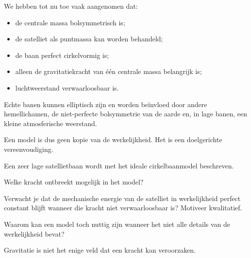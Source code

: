 \documentclass{ximera}
\begin{document}

We hebben tot nu toe vaak aangenomen dat:

\begin{itemize}
  \item de centrale massa bolsymmetrisch is;
  \item de satelliet als puntmassa kan worden behandeld;
  \item de baan perfect cirkelvormig is;
  \item alleen de gravitatiekracht van één centrale massa belangrijk is;
  \item luchtweerstand verwaarloosbaar is.
\end{itemize}

Echte banen kunnen elliptisch zijn en worden beïnvloed door andere
hemellichamen, de niet-perfecte bolsymmetrie van de aarde en, in lage
banen, een kleine atmosferische weerstand.

Een model is dus geen kopie van de werkelijkheid. Het is een
doelgerichte vereenvoudiging.


\begin{oefening}{\oefG}

Een zeer lage satellietbaan wordt met het ideale cirkelbaanmodel
beschreven.

\begin{question}
Welke kracht ontbreekt mogelijk in het model?
\end{question}

\begin{question}
Verwacht je dat de mechanische energie van de satelliet in werkelijkheid
perfect constant blijft wanneer die kracht niet verwaarloosbaar is?
Motiveer kwalitatief.
\end{question}

\begin{question}
Waarom kan een model toch nuttig zijn wanneer het niet alle details van
de werkelijkheid bevat?
\end{question}

\end{oefening}




Gravitatie is niet het enige veld dat een kracht kan veroorzaken.
\end{document}
